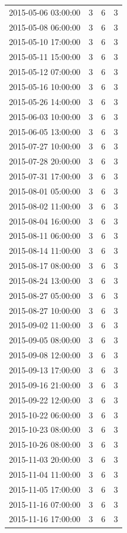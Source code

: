 \begin{tabular}{lrrr}
2015-05-06 03:00:00 & 3 & 6 & 3 \\
2015-05-08 06:00:00 & 3 & 6 & 3 \\
2015-05-10 17:00:00 & 3 & 6 & 3 \\
2015-05-11 15:00:00 & 3 & 6 & 3 \\
2015-05-12 07:00:00 & 3 & 6 & 3 \\
2015-05-16 10:00:00 & 3 & 6 & 3 \\
2015-05-26 14:00:00 & 3 & 6 & 3 \\
2015-06-03 10:00:00 & 3 & 6 & 3 \\
2015-06-05 13:00:00 & 3 & 6 & 3 \\
2015-07-27 10:00:00 & 3 & 6 & 3 \\
2015-07-28 20:00:00 & 3 & 6 & 3 \\
2015-07-31 17:00:00 & 3 & 6 & 3 \\
2015-08-01 05:00:00 & 3 & 6 & 3 \\
2015-08-02 11:00:00 & 3 & 6 & 3 \\
2015-08-04 16:00:00 & 3 & 6 & 3 \\
2015-08-11 06:00:00 & 3 & 6 & 3 \\
2015-08-14 11:00:00 & 3 & 6 & 3 \\
2015-08-17 08:00:00 & 3 & 6 & 3 \\
2015-08-24 13:00:00 & 3 & 6 & 3 \\
2015-08-27 05:00:00 & 3 & 6 & 3 \\
2015-08-27 10:00:00 & 3 & 6 & 3 \\
2015-09-02 11:00:00 & 3 & 6 & 3 \\
2015-09-05 08:00:00 & 3 & 6 & 3 \\
2015-09-08 12:00:00 & 3 & 6 & 3 \\
2015-09-13 17:00:00 & 3 & 6 & 3 \\
2015-09-16 21:00:00 & 3 & 6 & 3 \\
2015-09-22 12:00:00 & 3 & 6 & 3 \\
2015-10-22 06:00:00 & 3 & 6 & 3 \\
2015-10-23 08:00:00 & 3 & 6 & 3 \\
2015-10-26 08:00:00 & 3 & 6 & 3 \\
2015-11-03 20:00:00 & 3 & 6 & 3 \\
2015-11-04 11:00:00 & 3 & 6 & 3 \\
2015-11-05 17:00:00 & 3 & 6 & 3 \\
2015-11-16 07:00:00 & 3 & 6 & 3 \\
2015-11-16 17:00:00 & 3 & 6 & 3 \\

\end{tabular}
